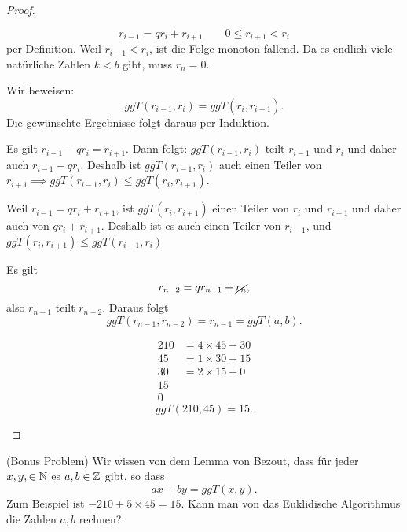 \begin{proof}
	\begin{parts}
	\item

		\[r_{i-1}=qr_{i}+r_{i+1}\qquad 0\le r_{i+1}<r_i\]
		per Definition. Weil $r_{i-1}<r_i$, ist die Folge monoton fallend. Da es endlich viele nat\"{u}rliche Zahlen $k<b$ gibt, muss $r_n=0$.
 

	\item Wir beweisen:
		\[
			ggT(r_{i-1}, r_i)=ggT(r_i,r_{i+1})
		.\]
		Die gewünschte Ergebnisse folgt daraus per Induktion.

		Es gilt $r_{i-1}-qr_i=r_{i+1}$. Dann folgt: $ggT(r_{i-1}, r_i)$ teilt $r_{i-1}$ und $r_i$ und daher auch $r_{i-1}-qr_i$. Deshalb ist $ggT(r_{i-1},r_i)$ auch einen Teiler von $r_{i+1}\implies ggT(r_{i-1},r_i)\le ggT(r_i, r_{i+1})$. 

		Weil $r_{i-1}=qr_i+r_{i+1}$, ist $ggT(r_i,r_{i+1})$ einen Teiler von $r_i$ und $r_{i+1}$ und daher auch von $qr_i+r_{i+1}$. Deshalb ist es auch einen Teiler von $r_{i-1}$, und $ggT(r_{i},r_{i+1})\le ggT(r_{i-1},r_i)$
	\item Es gilt
		\[
			r_{n-2}=qr_{n-1}+\cancel{r_{n}}
		,\] 
		also $r_{n-1}$ teilt $r_{n-2}$. Daraus folgt
		\[
			ggT(r_{n-1},r_{n-2})=r_{n-1}=ggT(a,b)
		.\] 
	\item 
		\begin{align*}
			210&=4 \times 45+30\\
			45&=1\times 30+15\\
			30&=2\times 15+0\\
			15&\\
			0&
		\end{align*}
		\[
		ggT(210,45)=15
		.\]

	\end{parts}
\end{proof}
\begin{Problem}
	(Bonus Problem) Wir wissen von dem Lemma von Bezout, dass f\"{u}r jeder $x,y,\in\mathbb{N}$ es $a,b\in \mathbb{Z}$ gibt, so dass
	\[
	ax+by=ggT(x,y)
	.\] 
	Zum Beispiel ist $-210+5\times 45=15$. Kann man von das Euklidische Algorithmus die Zahlen $a,b$ rechnen?
\end{Problem}
